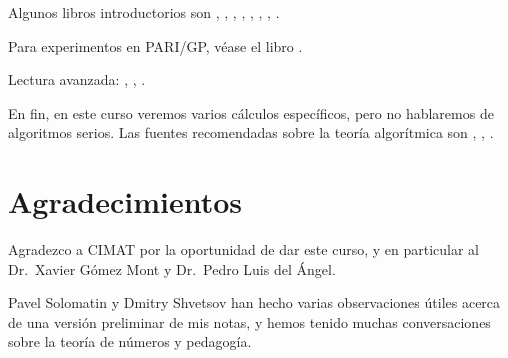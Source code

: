 Algunos libros introductorios son
\cite[Chapters 12, 13, 17]{Ireland-Rosen}, 
\cite{Alaca-Williams},
\cite{Kato-NT-2},
\cite{Frohlich-Taylor},
\cite{Marcus-NF},
\cite{Samuel-TAN},
\cite[Chapters 4, 5]{Borevich-Shafarevich},
\cite{Cox-2013}.

Para experimentos en PARI/GP, véase el libro
\cite{Rodriguez-Villegas-2007}.

Lectura avanzada:
\cite{Neukirch-ANT},
\cite{Lang-ANT},
\cite{Cassels-Frohlich}.

En fin, en este curso veremos varios cálculos específicos, pero no hablaremos
de algoritmos serios. Las fuentes recomendadas sobre la teoría algorítmica
son
\cite{Pohst-Zassenhaus},
\cite{Lenstra-1992},
\cite{Cohen-GTM138}.

\section{Agradecimientos}

Agradezco a CIMAT por la oportunidad de dar este curso, y en particular
al Dr.~Xavier Gómez Mont y Dr.~Pedro Luis del Ángel.

Pavel Solomatin y Dmitry Shvetsov han hecho varias observaciones útiles acerca
de una versión preliminar de mis notas, y hemos tenido muchas conversaciones
sobre la teoría de números y pedagogía.
